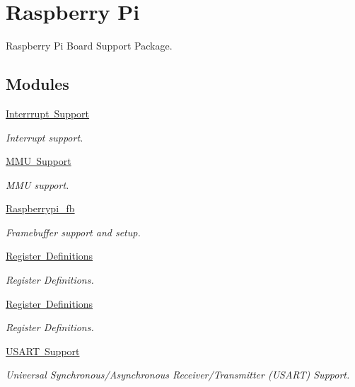 \hypertarget{group__RTEMSBSPsARMRaspberryPi}{}\section{Raspberry Pi}
\label{group__RTEMSBSPsARMRaspberryPi}


Raspberry Pi Board Support Package.  


\subsection*{Modules}
\begin{DoxyCompactItemize}
\item 
\mbox{\hyperlink{group__raspberrypi__interrupt}{Interrrupt Support}}
\begin{DoxyCompactList}\small\item\em Interrupt support. \end{DoxyCompactList}\item 
\mbox{\hyperlink{group__raspberrypi__mmu}{M\+M\+U Support}}
\begin{DoxyCompactList}\small\item\em M\+MU support. \end{DoxyCompactList}\item 
\mbox{\hyperlink{group__raspberrypi__fb}{Raspberrypi\+\_\+fb}}
\begin{DoxyCompactList}\small\item\em Framebuffer support and setup. \end{DoxyCompactList}\item 
\mbox{\hyperlink{group__raspberrypi__vc}{Register Definitions}}
\begin{DoxyCompactList}\small\item\em Register Definitions. \end{DoxyCompactList}\item 
\mbox{\hyperlink{group__raspberrypi__reg}{Register Definitions}}
\begin{DoxyCompactList}\small\item\em Register Definitions. \end{DoxyCompactList}\item 
\mbox{\hyperlink{group__raspberrypi__usart}{U\+S\+A\+R\+T Support}}
\begin{DoxyCompactList}\small\item\em Universal Synchronous/\+Asynchronous Receiver/\+Transmitter (U\+S\+A\+RT) Support. \end{DoxyCompactList}\end{DoxyCompactItemize}
